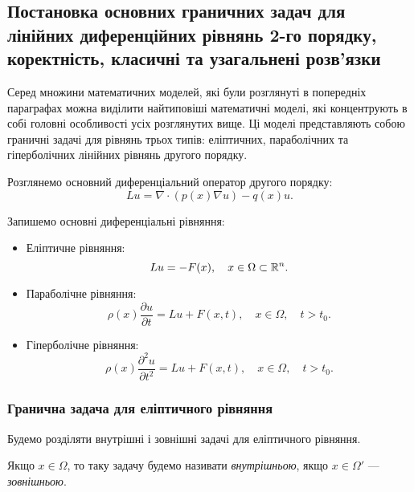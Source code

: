 \subsection{Постановка основних граничних задач для лінійних диференційних рівнянь 2-го порядку, коректність, класичні та узагальнені розв'язки}

Серед множини математичних моделей, які були розглянуті в попередніх параграфах можна виділити найтиповіші математичні моделі, які концентрують в собі головні особливості усіх розглянутих вище. Ці моделі представляють собою граничні задачі для рівнянь трьох типів: еліптичних, параболічних та гіперболічних лінійних рівнянь другого порядку. \medskip

Розглянемо основний диференціальний оператор другого порядку:
\begin{equation}
    L u = \nabla \cdot (p(x) \nabla u) - q(x) u.
\end{equation}

Запишемо основні диференціальні рівняння:
\begin{itemize}
    \item Еліптичне рівняння:
    \begin{equation}
        \label{eq:elliptic-differential-equation}
        L u = - F(x), \quad x \in \Omega \subset \mathbb{R}^n.
    \end{equation}
    \item Параболічне рівняння:
    \begin{equation}
        \label{eq:parabolic-differential-equation}
        \rho(x) \frac{\partial u}{\partial t} = L u + F(x, t), \quad x \in \Omega, \quad t > t_0.
    \end{equation}
    \item Гіперболічне рівняння:
    \begin{equation}
        \label{eq:hyperbolic-differential-equation}
        \rho(x) \frac{\partial^2 u}{\partial t^2} = L u + F(x, t), \quad x \in \Omega, \quad t > t_0.
    \end{equation}
\end{itemize}

\subsubsection{Гранична задача для еліптичного рівняння}

Будемо розділяти внутрішні і зовнішні задачі для еліптичного рівняння.

\begin{definition}
    Якщо $x \in \Omega$, то таку задачу будемо називати \textit{внутрішньою}, якщо $x \in \Omega'$ ---  \textit{зовнішньою}.
\end{definition}

